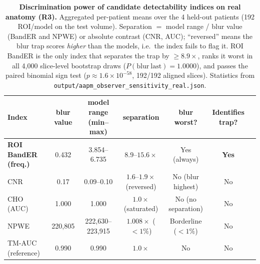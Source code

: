 \documentclass[twoside,11pt]{article}
\begin{document}
\begin{table}[ht]
    \centering
    \small
    \setlength{\tabcolsep}{4pt}
    \begin{tabular}{lcccccc}
        \toprule
        \textbf{Index} & \textbf{blur value} & \textbf{model range (min--max)} & \textbf{separation} & \textbf{blur worst?} & \textbf{Identifies trap?} \\
        \midrule
        \textbf{ROI BandER (freq.)} & 0.432 & 3.854--6.735 & $8.9$--$15.6\times$ & Yes (always) & \textbf{Yes} \\
        CNR & 0.17 & 0.09--0.10 & $1.6$--$1.9\times$ (reversed) & No (blur highest) & No \\
        CHO (AUC) & 1.000 & 1.000 & $1.0\times$ (saturated) & No (no separation) & No \\
        NPWE & 220{,}805 & 222{,}630--223{,}915 & $1.008\times$ ($<1\%$) & Borderline ($<1\%$) & No \\
        TM-AUC (reference) & 0.990 & 0.990 & $1.0\times$ & No & No \\
        \bottomrule
    \end{tabular}
    \caption{\textbf{Discrimination power of candidate detectability indices on real anatomy (R3).} Aggregated per-patient means over the 4 held-out patients (192 ROI/model on the test volume). Separation $=$ model range / blur value (BandER and NPWE) or absolute contrast (CNR, AUC); ``reversed'' means the blur trap scores \emph{higher} than the models, i.e.\ the index fails to flag it. ROI BandER is the only index that separates the trap by $\geq8.9\times$, ranks it worst in all 4{,}000 slice-level bootstrap draws ($P(\mathrm{blur~last})=1.0000$), and passes the paired binomial sign test ($p\approx1.6\times10^{-58}$, 192/192 aligned slices). Statistics from \texttt{output/aapm\_observer\_sensitivity\_real.json}.}
    \label{tab:metrics_discrimination}
\end{table}
\end{document}
